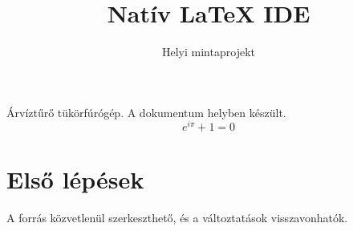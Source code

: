\documentclass[a4paper,11pt]{article}
\title{Natív LaTeX IDE}
\author{Helyi mintaprojekt}
\begin{document}
\maketitle
Árvíztűrő tükörfúrógép. A dokumentum helyben készült.
\[
  e^{i\pi} + 1 = 0
\]
\section{Első lépések}
A forrás közvetlenül szerkeszthető, és a változtatások visszavonhatók.
\end{document}
